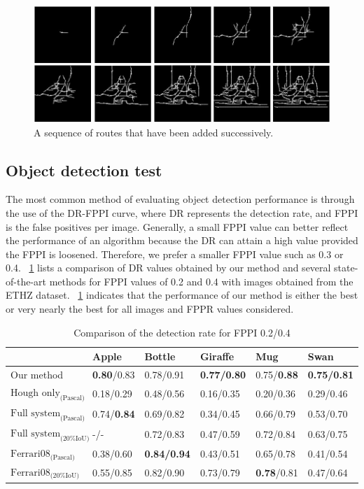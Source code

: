 \documentclass[journal]{IEEEtran}
\begin{document}
\begin{figure}[!t]
\centering
\includegraphics[width=0.8\linewidth]{images/fig20.jpg}
\caption{A sequence of routes that have been added successively.}
\label{fig:20}
\end{figure}

\subsection{Object detection test}

The most common method of evaluating object detection performance is through the use of the DR-FPPI curve, 
where DR represents the detection rate, and FPPI is the false positives per image. 
Generally, a small FPPI value can better reflect the performance of an algorithm because the DR can attain a high value provided the FPPI is loosened. 
Therefore, we prefer a smaller FPPI value such as 0.3 or 0.4. 
\tablename~\ref{tab:1} lists a comparison of DR values obtained by our method and several state-of-the-art methods 
\cite{ferrari2010,ferrari2008} for FPPI values of 0.2 and 0.4 with images obtained from the ETHZ dataset. 
\tablename~\ref{tab:1} indicates that the performance of our method is either the best or very nearly the best for all images and FPPR values considered.
 
\begin{table}[!t]
\renewcommand{\arraystretch}{1.3}
\caption{Comparison of the detection rate for FPPI 0.2/0.4}
\label{tab:1}
\centering
\scriptsize
\begin{tabular}{l|lllll}
\hline
& Apple & Bottle & Giraffe & Mug & Swan \\
\hline
Our method
& \textbf{0.80}/0.83
& 0.78/0.91
& \textbf{0.77/0.80}
& 0.75/\textbf{0.88}
& \textbf{0.75/0.81}\\
$\text{Hough only}_\text{(Pascal)}$
& 0.18/0.29
& 0.48/0.56
& 0.16/0.35
& 0.20/0.36
& 0.29/0.46\\
$\text{Full system}_\text{(Pascal)}$
& 0.74/\textbf{0.84}
& 0.69/0.82
& 0.34/0.45
& 0.66/0.79
& 0.53/0.70\\
$\text{Full system}_\text{(20\% IoU)}$
& -/-
& 0.72/0.83
& 0.47/0.59
& 0.72/0.84
& 0.63/0.75\\
$\text{Ferrari08}_\text{(Pascal)}$
& 0.38/0.60
& \textbf{0.84/0.94}
& 0.43/0.51
& 0.65/0.78
& 0.41/0.54\\
$\text{Ferrari08}_\text{(20\% IoU)}$
& 0.55/0.85
& 0.82/0.90
& 0.73/0.79
& \textbf{0.78}/0.81
& 0.47/0.64\\
\hline
\end{tabular}
\end{table}
\end{document}
